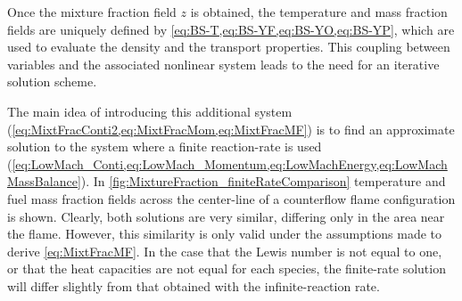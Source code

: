  Once the mixture fraction field $z$ is obtained, the temperature and mass fraction fields are uniquely defined by \cref{eq:BS-T,eq:BS-YF,eq:BS-YO,eq:BS-YP}, which are used to evaluate the density and the transport properties. This coupling between variables and the associated nonlinear system leads to the need for an iterative solution scheme.
 
 The main idea of introducing this additional system (\cref{eq:MixtFracConti2,eq:MixtFracMom,eq:MixtFracMF}) is to find an approximate solution to the system where a finite reaction-rate is used (\cref{eq:LowMach_Conti,eq:LowMach_Momentum,eq:LowMachEnergy,eq:LowMachMassBalance}). In \cref{fig:MixtureFraction_finiteRateComparison} temperature and fuel mass fraction fields across the center-line of a counterflow flame configuration is shown. Clearly, both solutions are very similar, differing only in the area near the flame. However, this similarity is only valid under the assumptions made to derive \cref{eq:MixtFracMF}. In the case that the Lewis number is not equal to one, or that the heat capacities are not equal for each species, the finite-rate solution will differ slightly from that obtained with the infinite-reaction rate. 
\newpage
